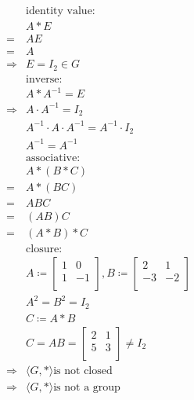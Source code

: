 \documentclass{article}
\begin{document}
\begin{equation*}
    \begin{split}
        &\text{identity value}:\\
        &A*E\\
        =&AE\\
        =&A\\
        \Rightarrow&E=I_2\in G\\
        &\text{inverse}:\\
        &A*A^{-1}=E\\
        \Rightarrow&A\cdot A^{-1}=I_2\\
        &A^{-1}\cdot A \cdot A^{-1}=A^{-1}\cdot I_2\\
        &A^{-1}=A^{-1}\\
        &\text{associative}:\\
        &A*(B*C)\\
        =&A*(BC)\\
        =&ABC\\
        =&(AB)C\\
        =&(A*B)*C\\
        &\text{closure}:\\
        &A\coloneqq \begin{bmatrix}
            1&0\\
            1&-1\\
        \end{bmatrix},B\coloneqq \begin{bmatrix}
            2&1\\
            -3&-2\\
        \end{bmatrix}\\
        &A^2=B^2=I_2\\
        &C\coloneqq A*B\\
        &C=AB=\begin{bmatrix}
            2&1\\
            5&3\\
        \end{bmatrix}\ne I_2\\
        \Rightarrow&\langle G,*\rangle\text{is not closed}\\
        \Rightarrow&\langle G,*\rangle\text{is not a group}\\
    \end{split}
\end{equation*}

\newpage
\end{document}
